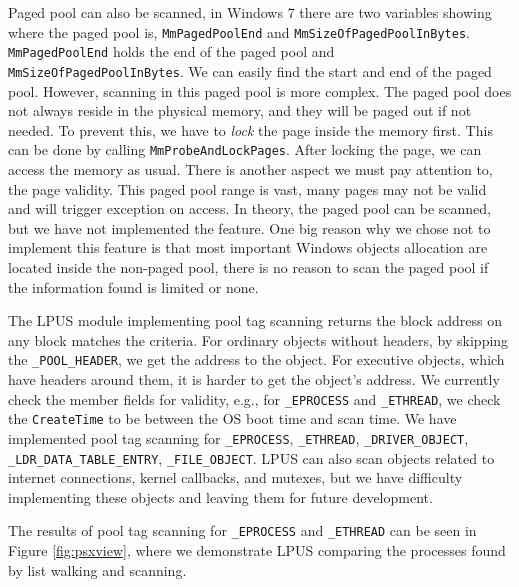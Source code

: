 Paged pool can also be scanned, in Windows 7 there are two variables showing
where the paged pool is, \texttt{MmPagedPoolEnd} and
\texttt{MmSizeOfPagedPoolInBytes}. \texttt{MmPagedPoolEnd} holds the end of the
paged pool and \texttt{MmSizeOfPagedPoolInBytes}. We can easily find the start
and end of the paged pool. However, scanning in this paged pool is more
complex.  The paged pool does not always reside in the physical memory, and
they will be paged out if not needed. To prevent this, we have to \textit{lock}
the page inside the memory first. This can be done by calling
\texttt{MmProbeAndLockPages}.  After locking the page, we can access the memory
as usual. There is another aspect we must pay attention to, the page validity.
This paged pool range is vast, many pages may not be valid and will trigger
exception on access. In theory, the paged pool can be scanned, but we have not
implemented the feature.  One big reason why we chose not to implement this
feature is that most important Windows objects allocation are located inside
the non-paged pool, there is no reason to scan the paged pool if the
information found is limited or none.

The LPUS module implementing pool tag scanning returns the block address on any
block matches the criteria. For ordinary objects without headers, by skipping
the \texttt{\_POOL\_HEADER}, we get the address to the object. For executive
objects, which have headers around them, it is harder to get the object's
address. We currently check the member fields for validity, e.g., for
\texttt{\_EPROCESS} and \texttt{\_ETHREAD}, we check the \texttt{CreateTime} to
be between the OS boot time and scan time. We have implemented pool tag
scanning for \texttt{\_EPROCESS}, \texttt{\_ETHREAD},
\texttt{\_DRIVER\_OBJECT}, \texttt{\_LDR\_DATA\_TABLE\_ENTRY},
\texttt{\_FILE\_OBJECT}. LPUS can also scan objects related to internet
connections, kernel callbacks, and mutexes, but we have difficulty implementing
these objects and leaving them for future development.

The results of pool tag scanning for \texttt{\_EPROCESS} and \texttt{\_ETHREAD}
can be seen in Figure \ref{fig:psxview}, where we demonstrate LPUS comparing
the processes found by list walking and scanning.

